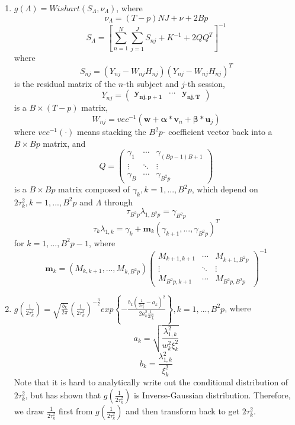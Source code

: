 \documentclass[12pt]{elsarticle}
\begin{document}
\begin{enumerate}
			\item $g\left(\Lambda\right) = Wishart(S_{\Lambda},\nu_{\Lambda})
			$, where
			\[\nu_{\Lambda}=(T-p)NJ+\nu+2Bp\]
			\[S_{\Lambda} = \left[ \sum_{n=1}^{N} \sum_{j=1}^{J} S_{nj} + K^{-1} + 2QQ^{T} \right] ^{-1}\]
			where
			\[S_{nj} =(Y_{nj}-W_{nj}H_{nj})(Y_{nj}-W_{nj}H_{nj})^{T}\]
			is the residual matrix of the $n$-th subject and $j$-th session,
			\[
			Y_{nj} =
			\begin{pmatrix}
			\boldsymbol{y_{nj,p+1}} & \cdots & \boldsymbol{y_{nj,T}}
			\end{pmatrix}
			\]
			is a $B \times (T-p)$ matrix,
			\[W_{nj} = vec^{-1} \left( \boldsymbol{w} + \boldsymbol{\alpha}*\boldsymbol{v}_{n} + \boldsymbol{\beta}*\boldsymbol{u}_{j} \right)\]
			where $vec^{-1}(\cdot)$ means stacking the $B^2p$- coefficient vector back into a $B \times Bp$ matrix, and 
			\[
			Q = 
			\begin{pmatrix}
			\gamma_1 & \cdots & \gamma_{(Bp-1)B+1} \\
			\vdots & \ddots & \vdots \\
			\gamma_{B} & \cdots & \gamma_{B^2p}
			\end{pmatrix}
			\]
			is a $B \times Bp$ matrix composed of $\gamma_k, k=1,...,B^2p$, which depend on $2\tau_k^2, k=1,...,B^2p$ and $\Lambda$ through
			\[\tau_{B^2p} \lambda_{1,B^2p} = \gamma_{B^2p}\]
			\[\tau_{k} \lambda_{1,k} = \gamma_{k}+\boldsymbol{m}_{k}\left(\gamma_{k+1},...,\gamma_{B^{2}p}\right)^{T}\]
			for $k=1,...,B^2p-1$, where
			\[
			\boldsymbol{m}_{k} = \left(M_{k,k+1},...,M_{k,B^2p}\right)
			{\begin{pmatrix}
				M_{k+1,k+1} & \cdots & M_{k+1, B^2p} \\
				\vdots & \ddots & \vdots \\
				M_{B^2p,k+1}  & \cdots & M_{B^2p,B^2p} 
				\end{pmatrix}}^{-1}
			\]
			
			
			
			\item $g(\frac{1}{2\tau_{k}^{2}}) =\sqrt{\frac{b_{k}}{2\pi}} \left( \frac{1}{2\tau_{k}^{2}} \right)^{-\frac{3}{2}}exp\left\{ -\frac{b_{k}\left(\frac{1}{2\tau_{k}^{2}}-a_{k}\right)^{2}} {2a_{k}^{2}\frac{1}{2\tau_{k}^{2}}}\right\}, k=1,...,B^2p$, where
			\[a_{k}=\sqrt{\frac{\lambda_{1,k}^{2}}{w_{k}^{2}\xi_{k}^{2}}}\]
			\[b_{k}=\frac{\lambda_{1,k}^{2}}{\xi_{k}^{2}}\]
			Note that it is hard to analytically write out the conditional distribution of $2\tau_{k}^{2}$, but \cite{Park} has shown that $g(\frac{1}{2\tau_{k}^{2}})$ is Inverse-Gaussian distribution. 
			Therefore, we draw $\frac{1}{2\tau_{k}^{2}}$ first from $g(\frac{1}{2\tau_{k}^{2}})$ and then transform back to get $2\tau_{k}^{2}$.
			
			
		\end{enumerate}
		
\end{document}
